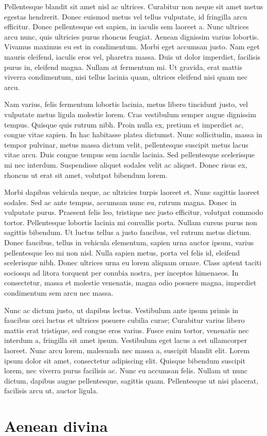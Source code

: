 Pellentesque blandit sit amet nisl ac ultrices. Curabitur non neque sit amet metus egestas hendrerit. Donec euismod metus vel tellus vulputate, id fringilla arcu efficitur. Donec pellentesque est sapien, in iaculis sem laoreet a. Nunc ultrices arcu nunc, quis ultricies purus rhoncus feugiat. Aenean dignissim varius lobortis. Vivamus maximus eu est in condimentum. Morbi eget accumsan justo. Nam eget mauris eleifend, iaculis eros vel, pharetra massa. Duis ut dolor imperdiet, facilisis purus in, eleifend magna. Nullam at fermentum mi. Ut gravida, erat mattis viverra condimentum, nisi tellus lacinia quam, ultrices eleifend nisi quam nec arcu.

Nam varius, felis fermentum lobortis lacinia, metus libero tincidunt justo, vel vulputate metus ligula molestie lorem. Cras vestibulum semper augue dignissim tempus. Quisque quis rutrum nibh. Proin nulla ex, pretium et imperdiet ac, congue vitae sapien. In hac habitasse platea dictumst. Nunc sollicitudin, massa in tempor pulvinar, metus massa dictum velit, pellentesque suscipit metus lacus vitae arcu. Duis congue tempus sem iaculis lacinia. Sed pellentesque scelerisque mi nec interdum. Suspendisse aliquet sodales velit ac aliquet. Donec risus ex, rhoncus ut erat sit amet, volutpat bibendum lorem.

Morbi dapibus vehicula neque, ac ultricies turpis laoreet et. Nunc sagittis laoreet sodales. Sed ac ante tempus, accumsan nunc eu, rutrum magna. Donec in vulputate purus. Praesent felis leo, tristique nec justo efficitur, volutpat commodo tortor. Pellentesque lobortis lacinia mi convallis porta. Nullam cursus purus non sagittis bibendum. Ut luctus tellus a justo faucibus, vel rutrum metus dictum. Donec faucibus, tellus in vehicula elementum, sapien urna auctor ipsum, varius pellentesque leo mi non nisl. Nulla sapien metus, porta vel felis id, eleifend scelerisque nibh. Donec ultrices urna eu lorem aliquam ornare. Class aptent taciti sociosqu ad litora torquent per conubia nostra, per inceptos himenaeos. In consectetur, massa et molestie venenatis, magna odio posuere magna, imperdiet condimentum sem arcu nec massa.

Nunc ac dictum justo, ut dapibus lectus. Vestibulum ante ipsum primis in faucibus orci luctus et ultrices posuere cubilia curae; Curabitur varius libero mattis erat tristique, sed congue eros varius. Fusce enim tortor, venenatis nec interdum a, fringilla sit amet ipsum. Vestibulum eget lacus a est ullamcorper laoreet. Nunc arcu lorem, malesuada nec massa a, suscipit blandit elit. Lorem ipsum dolor sit amet, consectetur adipiscing elit. Quisque bibendum suscipit lorem, nec viverra purus facilisis ac. Nunc eu accumsan felis. Nullam ut nunc dictum, dapibus augue pellentesque, sagittis quam. Pellentesque ut nisi placerat, facilisis arcu ut, auctor ligula.

\section{Aenean divina}
